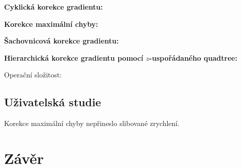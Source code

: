 \documentclass[11pt,a4paper,oneside]{article}
\begin{document}
	\textbf{Cyklická korekce gradientu:}

	\textbf{Korekce maximální chyby:}

	\textbf{Šachovnicová korekce gradientu:}

	\textbf{Hierarchická korekce gradientu pomocí $z$-uspořádaného quadtree:}

	Operační složitost:

	\subsection{Uživatelská studie}
	Korekce maximální chyby nepřineslo slibované zrychlení.

	\section{Závěr}

	
	
\end{document}
